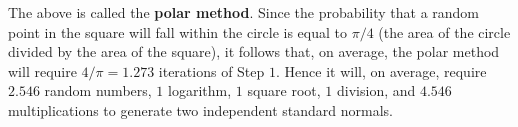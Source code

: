 \documentclass[11pt, a4paper]{article}
\begin{document}
The above is called the \textbf{polar method}. Since the probability that a random point in the square will fall within the circle is equal to $\pi/4$ (the area of the circle divided by the area of the square), it follows that, on average, the polar method will require $4/\pi = 1.273$ iterations of Step $1$. Hence it will, on average, require $2.546$ random numbers, $1$ logarithm, $1$ square root, $1$ division, and $4.546$ multiplications to generate two independent standard normals.
\end{document}
